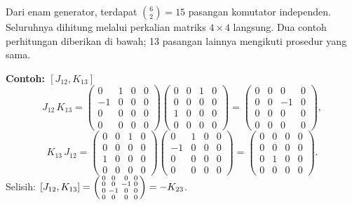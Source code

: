 Dari enam generator, terdapat $\binom{6}{2} = 15$ pasangan komutator independen. Seluruhnya dihitung melalui perkalian matriks $4 \times 4$ langsung. Dua contoh perhitungan diberikan di bawah; 13 pasangan lainnya mengikuti prosedur yang sama.

\noindent \textbf{Contoh: $[J_{12}, K_{13}]$}
\begin{equation}
    J_{12}\,K_{13} = \begin{pmatrix}0&1&0&0\\-1&0&0&0\\0&0&0&0\\0&0&0&0\end{pmatrix}\!\begin{pmatrix}0&0&1&0\\0&0&0&0\\1&0&0&0\\0&0&0&0\end{pmatrix}
    = \begin{pmatrix}0&0&0&0\\0&0&-1&0\\0&0&0&0\\0&0&0&0\end{pmatrix},
\end{equation}
\begin{equation}
    K_{13}\,J_{12} = \begin{pmatrix}0&0&1&0\\0&0&0&0\\1&0&0&0\\0&0&0&0\end{pmatrix}\!\begin{pmatrix}0&1&0&0\\-1&0&0&0\\0&0&0&0\\0&0&0&0\end{pmatrix}
    = \begin{pmatrix}0&0&0&0\\0&0&0&0\\0&1&0&0\\0&0&0&0\end{pmatrix}.
\end{equation}
Selisih: $[J_{12},K_{13}] = \begin{psmallmatrix}0&0&0&0\\0&0&-1&0\\0&-1&0&0\\0&0&0&0\end{psmallmatrix} = -K_{23}$.


